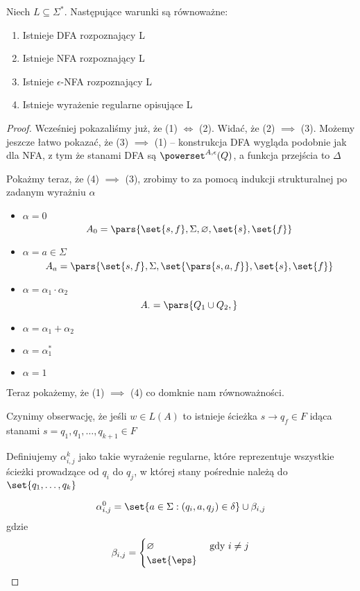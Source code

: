 \begin{theorem}
	Niech \( L \subseteq \Sigma^* \). Następujące warunki są równoważne:
	\begin{enumerate}
		\item Istnieje DFA rozpoznający L
		\item Istnieje NFA rozpoznający L
		\item Istnieje \(\epsilon\)-NFA rozpoznający L
		\item Istnieje wyrażenie regularne opisujące L
	\end{enumerate}
\end{theorem}
\begin{proof}

	Wcześniej pokazaliśmy już, że (1) \( \iff \) (2).
	Widać, że (2) \(\implies \) (3).
	Możemy jeszcze łatwo pokazać, że (3) \( \implies \) (1) -- konstrukcja DFA wygląda podobnie jak dla NFA, z tym że stanami DFA są \( \powerset^{A, \epsilon}(Q) \), a funkcja przejścia to \( \Delta \)

	Pokażmy teraz, że (4) \( \implies \) (3), zrobimy to za pomocą indukcji strukturalnej po zadanym wyrażniu \( \alpha \)

	\begin{itemize}
		\item \( \alpha = 0 \)
		      \[
			      A_0 = \pars{\set{s, f}, \Sigma, \varnothing, \set{s}, \set{f}}
		      \]

		\item \( \alpha = a \in \Sigma \)
		      \[
			      A_a = \pars{\set{s, f}, \Sigma, \set{
					      \pars{
						      s, a, f
					      }
				      }, \set{s}, \set{f}}
		      \]

		\item \( \alpha = \alpha_1 \cdot \alpha_2 \)
		      \[
			      A_{\cdot} = \pars{Q_1 \cup Q_2, }
		      \]

		\item \( \alpha = \alpha_1 + \alpha_2 \)

		\item \( \alpha = \alpha_1^* \)

		\item \( \alpha = 1 \)
	\end{itemize}


	Teraz pokażemy, że (1) \( \implies \) (4) co domknie nam równoważności.

	Czynimy obserwację, że jeśli \( w \in L(A) \) to istnieje ścieżka \( s \rightarrow q_f \in F \) idąca stanami \( s = q_1, q_1, \dots, q_{k+1} \in F \)

	Definiujemy \( \alpha_{i, j}^k \) jako takie wyrażenie regularne, które reprezentuje wszystkie ścieżki prowadzące od \( q_i \) do \( q_j \), w której stany pośrednie należą do \( \set{q_1, \dots, q_k} \)

	\[
		\alpha_{i, j}^0 = \set{a \in \Sigma : (q_i, a, q_j) \in \delta } \cup \beta_{i, j}
	\]
	gdzie
	\[
		\beta_{i, j} = \begin{cases}
			\varnothing & \text{ gdy } i \neq j \\
			\set{\eps}
		\end{cases}
	\]
\end{proof}
